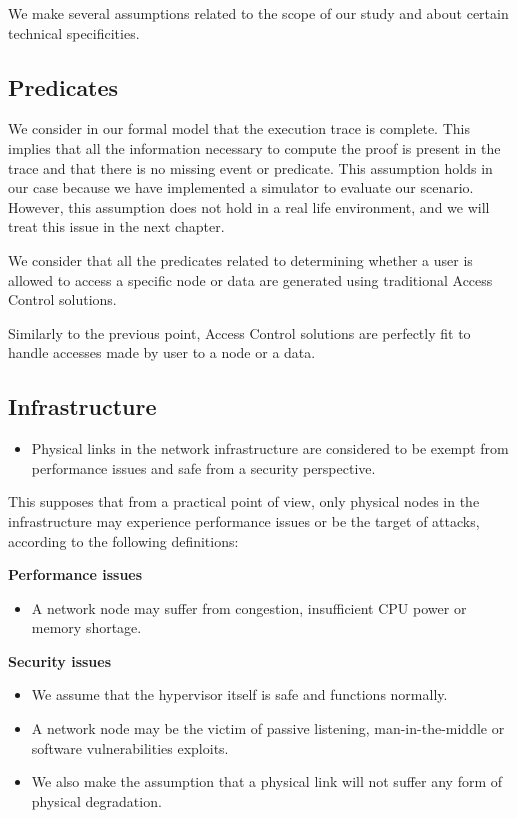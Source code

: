 We make several assumptions related to the scope of our study and about certain technical specificities.

\subsection{Predicates}
We consider in our formal model that the execution trace is complete.
This implies that all the information necessary to compute the proof is present in the trace and that there is no missing event or predicate.
This assumption holds in our case because we have implemented a simulator to evaluate our scenario. However, this assumption does not hold in a real life environment, and we will treat this issue in the next chapter.

We consider that all the predicates related to determining whether a user is allowed to access a specific node or data are generated using traditional Access Control solutions.

Similarly to the previous point, Access Control solutions are perfectly fit to handle accesses made by user to a node or a data.


\subsection{Infrastructure}
\begin{itemize}
    \item Physical links in the network infrastructure are considered to be exempt from performance issues and safe from a security perspective.
\end{itemize}

This supposes that from a practical point of view, only physical nodes in the infrastructure may experience performance issues or be the target of attacks, according to the following definitions:

\textbf{Performance issues} 
\begin{itemize}
    \item A network node may suffer from congestion, insufficient CPU power or memory shortage. 
\end{itemize} 

\textbf{Security issues} 
\begin{itemize}
    \item We assume that the hypervisor itself is safe and functions normally.
    \item A network node may be the victim of passive listening, man-in-the-middle or software vulnerabilities exploits.
    \item We also make the assumption that a physical link will not suffer any form of physical degradation.
\end{itemize}

